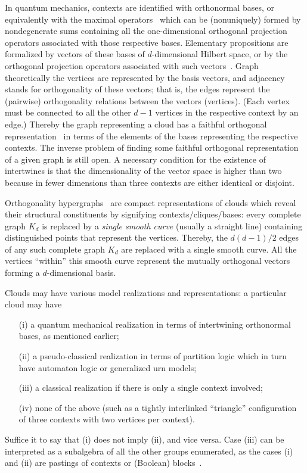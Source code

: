 \documentclass[%
  reprint,
  twocolumn,
 showpacs,
 showkeys,
 preprintnumbers,
 amsmath,amssymb,
 aps,
  prl,
  longbibliography,
 ]{revtex4-1}
\begin{document}
In quantum mechanics, contexts are identified with orthonormal bases,
or equivalently with the maximal operators~\cite[\S~84, Theorem~1, p.~171]{halmos-vs}
which can be (nonuniquely) formed by nondegenerate sums containing all the one-dimensional orthogonal projection operators
associated with those respective bases.
Elementary propositions are formalized by vectors of these bases of $d$-dimensional Hilbert space,
or by the orthogonal projection operators associated with such vectors~\cite{birkhoff-36}.
Graph theoretically the vertices are represented by the basis vectors,
and adjacency stands for orthogonality of these vectors;
that is, the edges represent the (pairwise) orthogonality
relations between the vectors (vertices).
(Each vertex must be connected to all the other $d-1$ vertices in the respective context by an edge.)
Thereby the graph representing a cloud
has a faithful orthogonal representation~\cite{lovasz-89,Portillo-2015}
in terms of the elements of the bases representing the respective contexts.
The inverse problem of finding some faithful orthogonal representation of a given graph is still open.
A necessary condition for the existence of intertwines is that the dimensionality of the
vector space is higher than two because in fewer dimensions than three contexts are either identical or disjoint.

Orthogonality hypergraphs~\cite{greechie:71} are compact representations of clouds
which reveal their structural constituents by signifying contexts/cliques/bases:
every complete graph $K_d$  is replaced by a {\em single smooth curve} (usually a straight line)
containing distinguished points that represent the vertices.
Thereby,  the $d(d - 1)/2$ edges of any such complete graph $K_d$ are replaced with a single smooth curve.
All the vertices ``within'' this smooth curve represent the mutually orthogonal vectors forming a $d$-dimensional basis.


Clouds may have various model realizations and representations: a particular cloud may have
\begin{itemize}
\item[(i)] a quantum mechanical realization in terms of intertwining orthonormal bases, as mentioned earlier;
\item[(ii)] a pseudo-classical realization in terms of partition logic which in turn have automaton logic or generalized urn models;
\item[(iii)] a classical realization if there is only a single context involved;
\item[(iv)] none of the above (such as a tightly interlinked ``triangle'' configuration of three contexts with two vertices per context).
\end{itemize}
Suffice it to say that (i) does not imply (ii), and vice versa.
Case (iii) can be interpreted as
a subalgebra of all the other groups enumerated, as the cases (i) and (ii) are pastings of contexts or (Boolean) blocks~\cite{nav:91}.
\end{document}
